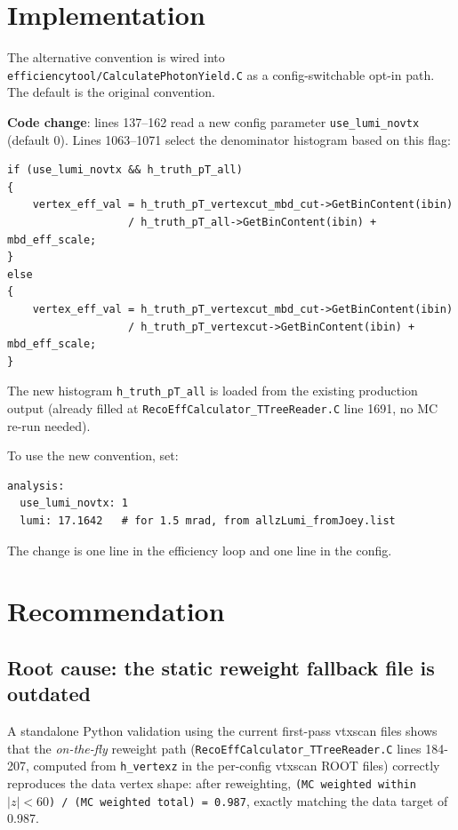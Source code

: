 \documentclass[11pt,letterpaper]{article}
\begin{document}
\section{Implementation}
\label{sec:implementation}

The alternative convention is wired into
\texttt{efficiencytool/CalculatePhotonYield.C} as a config-switchable
opt-in path. The default is the original convention.

\textbf{Code change}: lines 137--162 read a new config parameter
\texttt{use\_lumi\_novtx} (default 0). Lines 1063--1071 select the
denominator histogram based on this flag:

\begin{verbatim}
if (use_lumi_novtx && h_truth_pT_all)
{
    vertex_eff_val = h_truth_pT_vertexcut_mbd_cut->GetBinContent(ibin)
                   / h_truth_pT_all->GetBinContent(ibin) + mbd_eff_scale;
}
else
{
    vertex_eff_val = h_truth_pT_vertexcut_mbd_cut->GetBinContent(ibin)
                   / h_truth_pT_vertexcut->GetBinContent(ibin) + mbd_eff_scale;
}
\end{verbatim}

The new histogram \texttt{h\_truth\_pT\_all} is loaded from the existing
production output (already filled at \texttt{RecoEffCalculator\_TTreeReader.C}
line 1691, no MC re-run needed).

To use the new convention, set:
\begin{verbatim}
analysis:
  use_lumi_novtx: 1
  lumi: 17.1642   # for 1.5 mrad, from allzLumi_fromJoey.list
\end{verbatim}

The change is one line in the efficiency loop and one line in the config.

\section{Recommendation}
\label{sec:recommendation}

\subsection{Root cause: the static reweight fallback file is outdated}

A standalone Python validation using the current first-pass vtxscan
files shows that the \emph{on-the-fly} reweight path
(\texttt{RecoEffCalculator\_TTreeReader.C} lines 184-207, computed
from \texttt{h\_vertexz} in the per-config vtxscan ROOT files)
correctly reproduces the data vertex shape: after reweighting,
\texttt{(MC weighted within $|z|<60$) / (MC weighted total) = 0.987},
exactly matching the data target of 0.987.
\end{document}
